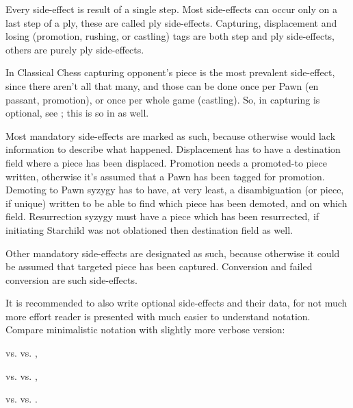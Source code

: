 Every side-effect is result of a single step. Most side-effects can occur only on
a last step of a ply, these are called ply side-effects. Capturing, displacement
and losing (promotion, rushing, or castling) tags are both step and ply side-effects,
others are purely ply side-effects.

In Classical Chess capturing opponent's piece is the most prevalent side-effect,
since there aren't all that many, and those can be done once per Pawn (en passant,
promotion), or once per whole game (castling). So, in  capturing is
optional, see ; this is so in  as well.

Most mandatory side-effects are marked as such, because otherwise 
would lack information to describe what happened. Displacement has to have a
destination field where a piece has been displaced. Promotion needs a promoted-to
piece written, otherwise it's assumed that a Pawn has been tagged for promotion.
Demoting to Pawn syzygy has to have, at very least, a disambiguation (or piece,
if unique) written to be able to find which piece has been demoted, and on which
field. Resurrection syzygy must have a piece which has been resurrected, if
initiating Starchild was not oblationed then destination field as well.

Other mandatory side-effects are designated as such, because otherwise it could
be assumed that targeted piece has been captured. Conversion and failed conversion
are such side-effects.

It is recommended to also write optional side-effects and their data, for not much
more effort reader is presented with much easier to understand notation. Compare
minimalistic notation with slightly more verbose version:

\noindent
{} vs. \newline
{} vs. \newline
{},

\noindent
{} vs. \newline
{} vs. \newline
{},

\noindent
{} vs. \newline
{} vs. \newline
{}.


